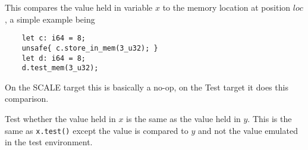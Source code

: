 This compares the value held in variable $x$ to the memory location
at position $loc$, a simple example being
\begin{lstlisting}
    let c: i64 = 8;
    unsafe{ c.store_in_mem(3_u32); }
    let d: i64 = 8;
    d.test_mem(3_u32);
\end{lstlisting}
On the SCALE target this is basically a no-op, on the Test target
it does this comparison.

Test whether the value held in $x$ is the same as the value held in $y$.
This is the same as \verb|x.test()| except the value is compared to
$y$ and not the value emulated in the test environment.
